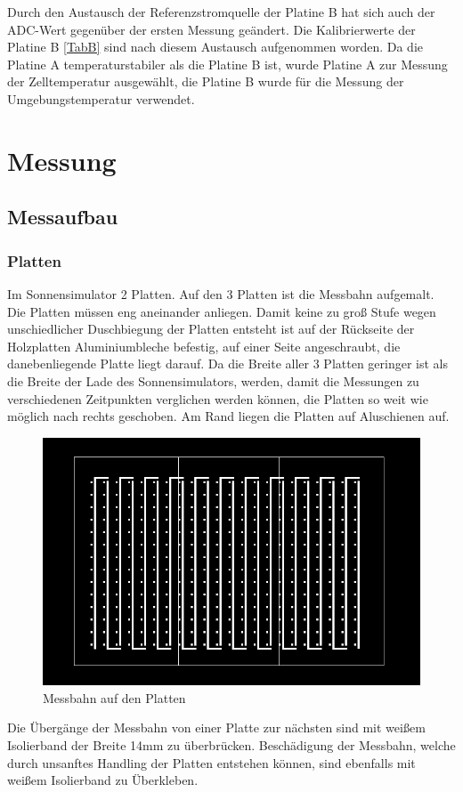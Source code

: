 \documentclass[a4paper,bibtotoc,oneside]{scrbook}
\begin{document}
Durch den Austausch der Referenzstromquelle der Platine B hat sich auch der ADC-Wert gegenüber der ersten Messung geändert. Die Kalibrierwerte der Platine B \ref{TabB} sind nach diesem Austausch aufgenommen worden.
Da die Platine A temperaturstabiler als die Platine B ist, wurde Platine A zur Messung der Zelltemperatur ausgewählt, die Platine B wurde für die Messung der Umgebungstemperatur verwendet. 







\chapter{Messung}\thispagestyle{empty}
\section{Messaufbau}\thispagestyle{empty}
  \subsection{Platten}\thispagestyle{empty}
Im Sonnensimulator 2 Platten. Auf den 3 Platten ist die Messbahn aufgemalt.
Die Platten müssen eng aneinander anliegen. Damit keine zu groß Stufe wegen unschiedlicher Duschbiegung der Platten entsteht ist auf der Rückseite der Holzplatten Aluminiumbleche befestig, auf einer Seite angeschraubt, die danebenliegende Platte liegt darauf.
Da die Breite aller 3 Platten geringer ist als die Breite der Lade des Sonnensimulators, werden, damit die Messungen zu verschiedenen Zeitpunkten verglichen werden können, die Platten so weit wie möglich nach rechts geschoben. Am Rand liegen die Platten auf Aluschienen auf.
\begin{figure}[htbp]
\centering
\includegraphics[width=125mm]{img/messbahn1.png}
\caption[Messbahn auf den Platten]{Messbahn auf den Platten}\label{bahn}
\end{figure}
Die Übergänge der Messbahn von einer Platte zur nächsten sind mit weißem Isolierband  der Breite 14mm zu überbrücken. Beschädigung der Messbahn, welche durch unsanftes Handling der Platten entstehen können, sind ebenfalls mit weißem Isolierband zu Überkleben.
\end{document}
